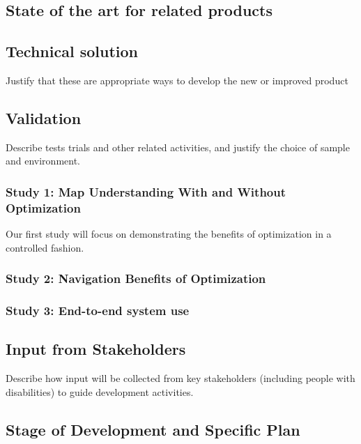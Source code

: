 
\subsection{State of the art for related products}

\subsection{Technical solution}
Justify that these are appropriate ways to develop the new or improved product


\subsection{Validation}
Describe tests trials and other related activities, and justify the choice of sample and environment. 
\subsubsection{Study 1: Map Understanding With and Without Optimization}
\label{sec:lab-tests}
Our first study will focus on demonstrating the benefits of optimization in a controlled fashion. 

\subsubsection{Study 2: Navigation Benefits of Optimization}
\label{sec:field-map}

\subsubsection{Study 3: End-to-end system use}
\label{sec:field-web}

\subsection{Input from Stakeholders}
Describe how input will be collected from key stakeholders (including people with disabilities) to guide development activities.

\subsection{Stage of Development and Specific Plan}

